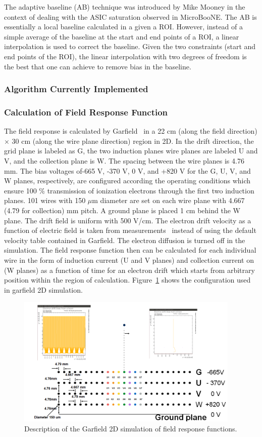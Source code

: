 The adaptive baseline (AB) technique was introduced by 
Mike Mooney in the context of dealing with the ASIC saturation observed in MicroBooNE.
The AB is essentially a local baseline calculated in a given a ROI. However, instead of 
a simple average of the baseline at the start and end points of a ROI, a linear
interpolation is used to correct the baseline. Given the two constraints (start and 
end points of the ROI), the linear interpolation with two degrees of freedom is the best 
that one can achieve to  remove bias in the baseline. 


\subsubsection{Algorithm Currently Implemented}

\subsubsection{Calculation of Field Response Function}

The field response is calculated by Garfield~\cite{garfield} in a 22 cm (along the 
field direction) $\times$ 30 cm (along the wire plane direction) region in 2D.  
In the drift direction, the grid plane is labeled as G, the two induction planes wire 
planes are labeled U and V, and the collection plane is W.  The spacing between the wire 
planes is 4.76 mm. The bias voltages of-665 V, -370 V, 0 V, and +820 V for the G, U, V, and 
W planes, respectively, are configured according the operating conditions which ensure 100 \%
    transmission of ionization electrons through the first two induction planes.  
    101 wires with 150 $\mu$m diameter are set on each wire plane with 4.667 (4.79 for collection) mm
    pitch.  A ground plane is placed 1 cm behind the W plane.  The drift
    field is uniform with 500 V/cm. The electron drift velocity as a function of
    electric field is taken from measurements~\cite{Li:2015rqa,lar_property}
    instead of using the default velocity table contained in Garfield. The electron
    diffusion is turned off in the simulation. The field response function then can
    be calculated for each individual wire in the form of induction current 
    (U and V planes) and collection current on (W planes) as a function of time for
    an electron drift which starts from arbitrary position within the region of calculation.
    Figure~\ref{fig:garfield_2d} shows the configuration used in garfield 2D simulation.

\begin{figure}[htb]
\centering
\includegraphics[width=0.95\textwidth]{figures/Garfield_simu.png}
\caption{Description of the Garfield 2D simulation of field response functions.}
\label{fig:garfield_2d}
\end{figure}
